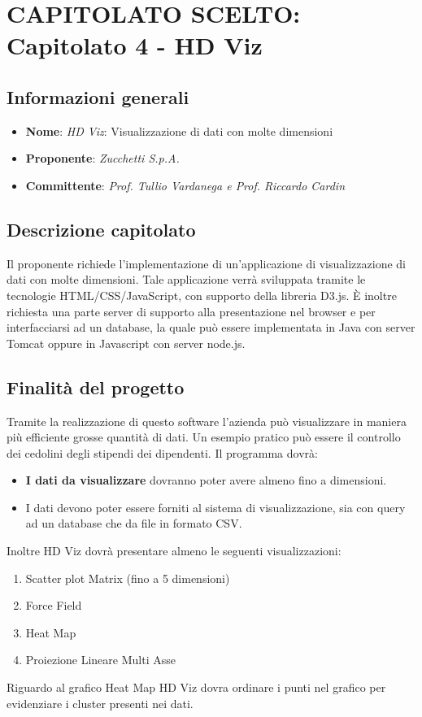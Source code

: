 \section{CAPITOLATO SCELTO: Capitolato 4 - HD Viz}
\subsection{Informazioni generali}
\begin{itemize}
    \item \textbf{Nome}: \emph{HD Viz}: Visualizzazione di dati con molte dimensioni
    \item \textbf{Proponente}: \emph{Zucchetti S.p.A.}
    \item \textbf{Committente}: \emph{Prof. Tullio Vardanega e Prof. Riccardo Cardin}
\end{itemize}
\subsection{Descrizione capitolato}
Il proponente richiede l'implementazione di un'applicazione di visualizzazione di dati con molte dimensioni. Tale applicazione verrà sviluppata tramite le tecnologie HTML/CSS/JavaScript, con supporto della libreria D3.js. È inoltre richiesta una parte server di supporto alla presentazione nel browser e per interfacciarsi ad un  database, la quale può essere implementata in Java con server Tomcat oppure in Javascript con server node.js.
\subsection{Finalità del progetto}
Tramite la realizzazione di questo software l'azienda può visualizzare in maniera più efficiente grosse quantità di dati. Un esempio pratico può essere il controllo dei cedolini degli stipendi dei dipendenti. Il programma dovrà:
\begin{itemize}
    \item \textbf{I dati da visualizzare} dovranno poter avere almeno fino a  dimensioni.
    \item I dati devono poter essere forniti al sistema di visualizzazione, sia con query ad un database che da file in formato CSV.
\end{itemize}
Inoltre HD Viz dovrà presentare almeno le seguenti visualizzazioni:
\begin{enumerate}
	\item Scatter plot Matrix (fino a 5 dimensioni)
	\item Force Field
	\item Heat Map
	\item Proiezione Lineare Multi Asse
\end{enumerate}
Riguardo al grafico Heat Map HD Viz dovra ordinare i punti nel grafico per evidenziare i cluster presenti nei dati.
